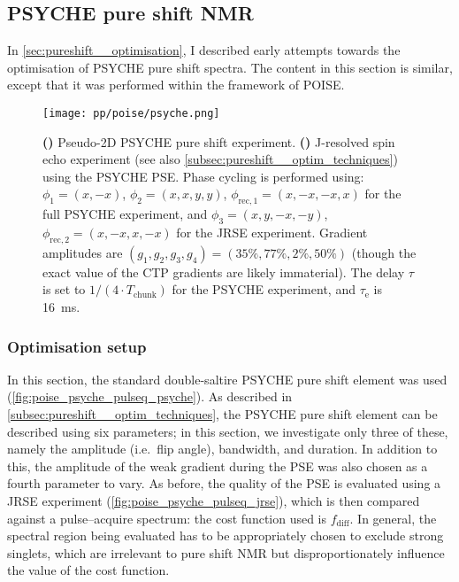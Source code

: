 \subsection{PSYCHE pure shift NMR}
\label{subsec:poise__psyche}

In \cref{sec:pureshift__optimisation}, I described early attempts towards the optimisation of PSYCHE pure shift spectra.
The content in this section is similar, except that it was performed within the framework of POISE.

\begin{figure}[htb]
    \centering
    \texttt{[image: pp/poise/psyche.png]}
    {\label{fig:poise_psyche_pulseq_psyche}}
    {\label{fig:poise_psyche_pulseq_jrse}}
    \caption[Pulse sequences used for PSYCHE optimisations]{
        \textbf{()} Pseudo-2D PSYCHE pure shift experiment.
        \textbf{()} J-resolved spin echo experiment (see also \cref{subsec:pureshift__optim_techniques}) using the PSYCHE PSE.
        Phase cycling is performed using: $\phi_1 = (x, -x)$, $\phi_2 = (x, x, y, y)$, $\phi_{\text{rec},1} = (x, -x, -x, x)$ for the full PSYCHE experiment, and $\phi_3 = (x, y, -x, -y)$, $\phi_{\text{rec},2} = (x, -x, x, -x)$ for the JRSE experiment.
        Gradient amplitudes are $(g_1, g_2, g_3, g_4) = (35\%, 77\%, 2\%, 50\%)$ (though the exact value of the CTP gradients are likely immaterial).
        The delay $\tau$ is set to $1/(4 \cdot T_\text{chunk})$ for the PSYCHE experiment, and $\tau_\text{e}$ is \SI{16}{\ms}.
    }
    \label{fig:poise_psyche_pulseq}
\end{figure}



\subsubsection{Optimisation setup}

In this section, the standard double-saltire PSYCHE pure shift element was used (\cref{fig:poise_psyche_pulseq_psyche}).
As described in \cref{subsec:pureshift__optim_techniques}, the PSYCHE pure shift element can be described using six parameters; in this section, we investigate only three of these, namely the amplitude (i.e.\ flip angle), bandwidth, and duration.
In addition to this, the amplitude of the weak gradient during the PSE was also chosen as a fourth parameter to vary.
As before, the quality of the PSE is evaluated using a JRSE experiment (\cref{fig:poise_psyche_pulseq_jrse}), which is then compared against a pulse--acquire spectrum: the cost function used is $f_\text{diff}$.
In general, the spectral region being evaluated has to be appropriately chosen to exclude strong singlets, which are irrelevant to pure shift NMR but disproportionately influence the value of the cost function.

